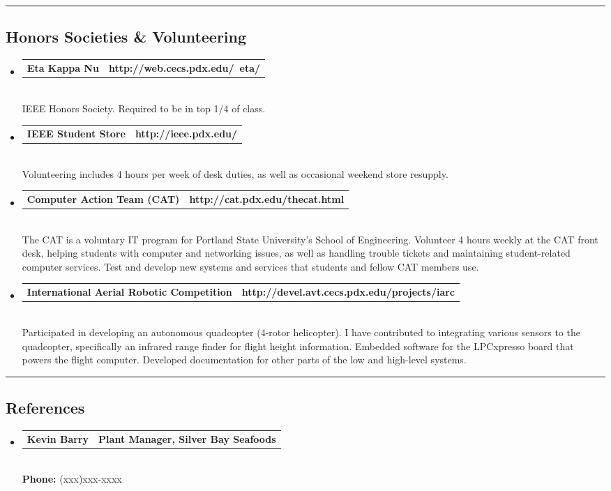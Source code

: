 \documentclass[10pt,letterpaper]{article}
\makeatletter
\newcommand{\headerrow}[2]
{\begin{tabular*}{\linewidth}{l@{\extracolsep{\fill}}r}
	#1 &
	#2 \\
\end{tabular*}}
\makeatother
\begin{document}
\hrule
\vspace{-0.4em}
\subsection*{Honors Societies \& Volunteering}
\begin{itemize}
  \item
	\headerrow
		{\textbf{Eta Kappa Nu}}
		{\textbf{http://web.cecs.pdx.edu/~eta/}}
	\\
  IEEE Honors Society. Required to be in top 1/4 of class.

  \item
	\headerrow
		{\textbf{IEEE Student Store}}
		{\textbf{http://ieee.pdx.edu/}}
	\\
  Volunteering includes 4 hours per week of desk duties, as well as occasional weekend store resupply.

  \item
  \headerrow
    {\textbf{Computer Action Team (CAT)}}
		{\textbf{http://cat.pdx.edu/thecat.html}}
	\\
  The CAT is a voluntary IT program for Portland State University's School of Engineering. Volunteer 4 hours weekly at the CAT front desk, helping students with computer and networking issues, as well as handling trouble tickets and maintaining student-related computer services. Test and develop new systems and services that students and fellow CAT members use. 

  \item
  \headerrow
    {\textbf{International Aerial Robotic Competition}}
		{\textbf{http://devel.avt.cecs.pdx.edu/projects/iarc}}
	\\
  Participated in developing an autonomous quadcopter (4-rotor helicopter). I have contributed to integrating various sensors to the quadcopter, specifically an infrared range finder for flight height information. Embedded software for the LPCxpresso board that powers the flight computer. Developed documentation for other parts of the low and high-level systems.

\end{itemize}

\hrule
\vspace{-0.4em}
\subsection*{References}
\begin{itemize}
  \item
  \headerrow
    {\textbf{Kevin Barry}}
    {\textbf{Plant Manager, Silver Bay Seafoods}}
  \\
  \textbf{Phone: } (xxx)xxx-xxxx

\end{itemize}
\end{document}

